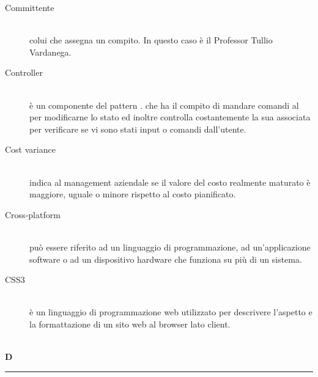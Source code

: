 \documentclass[12pt,a4paper]{article}
\begin{document}
\begin{description}
\item[Committente] 
\hfill\\ colui che assegna un compito. In questo caso è il Professor Tullio Vardanega.

\item[Controller] 
\hfill\\ è un componente del pattern . che ha il compito di mandare comandi al  per modificarne lo stato ed inoltre controlla costantemente la sua  associata per verificare se vi sono stati input o comandi dall'utente.

\item[Cost variance] 
\hfill\\ indica al management aziendale se il valore del costo realmente maturato è maggiore, uguale o minore rispetto al costo pianificato.

\item[Cross-platform] 
\hfill\\ può essere riferito ad un linguaggio di programmazione, ad un'applicazione software o ad un dispositivo hardware che funziona su più di un sistema.

\item[CSS3] 
\hfill\\ è un linguaggio di programmazione web utilizzato per descrivere l'aspetto e la formattazione di un sito web al browser lato client.
\end{description}

\newpage

\begin{center}
\hfill\\
	\LARGE \textbf{D}
\hfill\\
\rule[15pt]{30pt}{0.5pt}
\end{center}
\end{document}
